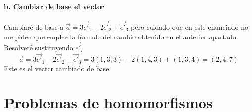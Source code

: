 \begin{problema}{\cite[8p345]{palacios}}
	\paragraph{b. Cambiar de base el vector} Cambiaré de base 
	a $\vec{a}=3\vec{e'}_1-2\vec{e'}_2+\vec{e'}_3$ pero cuidado que
	en este enunciado no me piden que emplee la fórmula del cambio obtenido en el anterior apartado. 
	Resolveré sustituyendo $\vec{e'}_i$
	$$\vec{a}=3\vec{e'}_1-2\vec{e'}_2+\vec{e'}_3=3(1,3,3)-2(1,4,3)+(1,3,4)=(2,4,7)$$
	Este es el vector cambiado de base.

\end{problema}

\section{Problemas de homomorfismos}

